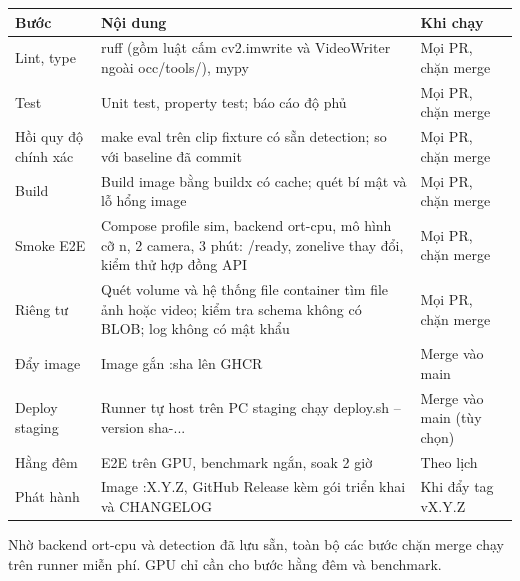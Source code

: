 \documentclass[10pt,a4paper,oneside,openany]{report}
\newcommand{\breakus}{\textunderscore\allowbreak}
\newcommand{\file}[1]{{\ttfamily\let\_\breakus #1}}
\newcommand{\code}[1]{{\ttfamily\let\_\breakus #1}}
\newcommand{\tabhead}[1]{\textsf{\bfseries\color{ink}#1}}
\newenvironment{bang}{\par\small\rowcolors{2}{rowgray}{white}}{\par\vspace{0.3em}}
\begin{document}
\begin{bang}
\begin{xltabular}{\linewidth}{L{30mm}Y L{30mm}}
\toprule
\tabhead{Bước} & \tabhead{Nội dung} & \tabhead{Khi chạy} \\
\midrule
\endhead
Lint, type & ruff (gồm luật cấm \code{cv2.imwrite} và \code{VideoWriter} ngoài \file{occ/tools/}), mypy & Mọi PR, chặn merge \\
Test & Unit test, property test; báo cáo độ phủ & Mọi PR, chặn merge \\
Hồi quy độ chính xác & \code{make eval} trên clip fixture có sẵn detection; so với baseline đã commit & Mọi PR, chặn merge \\
Build & Build image bằng buildx có cache; quét bí mật và lỗ hổng image & Mọi PR, chặn merge \\
Smoke E2E & Compose profile \code{sim}, backend \code{ort-cpu}, mô hình cỡ n, 2 camera, 3 phút: \code{/ready}, \code{zone\_live} thay đổi, kiểm thử hợp đồng API & Mọi PR, chặn merge \\
Riêng tư & Quét volume và hệ thống file container tìm file ảnh hoặc video; kiểm tra schema không có BLOB; log không có mật khẩu & Mọi PR, chặn merge \\
Đẩy image & Image gắn \code{:sha} lên GHCR & Merge vào \code{main} \\
Deploy staging & Runner tự host trên PC staging chạy \code{deploy.sh --version sha-...} & Merge vào \code{main} (tùy chọn) \\
Hằng đêm & E2E trên GPU, benchmark ngắn, soak 2 giờ & Theo lịch \\
Phát hành & Image \code{:X.Y.Z}, GitHub Release kèm gói triển khai và CHANGELOG & Khi đẩy tag \code{vX.Y.Z} \\
\bottomrule
\end{xltabular}
\end{bang}

\begin{meo}
Nhờ backend \code{ort-cpu} và detection đã lưu sẵn, toàn bộ các bước chặn merge chạy trên runner miễn phí. GPU chỉ cần cho bước hằng đêm và benchmark.
\end{meo}
\end{document}
